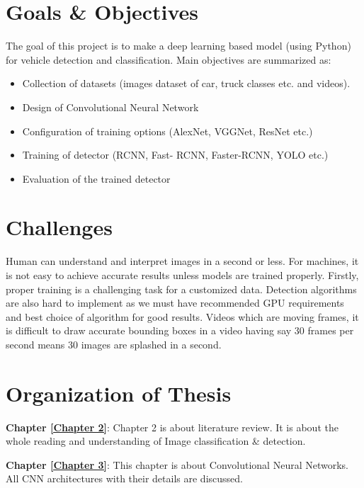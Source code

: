 \section{Goals \& Objectives}

The goal of this project is to make a deep learning based model (using Python) for vehicle detection and classification. Main objectives are summarized as:
\begin{itemize}
\item Collection of datasets (images dataset of car, truck classes etc. and videos).
\item Design of Convolutional Neural Network
\item Configuration of training options (AlexNet, VGGNet, ResNet etc.)
\item Training of detector (RCNN, Fast- RCNN, Faster-RCNN, YOLO etc.)
\item Evaluation of the trained detector
\end{itemize}

\section{Challenges}

Human can understand and interpret images in a 
second or less. For machines, it is not easy to achieve 
accurate results unless models are trained properly. Firstly, proper 
training is a challenging task for a customized data. Detection 
algorithms are also hard to implement as we must have recommended 
GPU requirements and best choice of algorithm for good results. Videos 
which are moving frames, it is difficult to draw accurate bounding boxes 
in a video having say 30 frames per second 
means 30 images are splashed in a second. 	


\section{Organization of Thesis}

\textbf{Chapter \ref{Chapter 2}}: Chapter 2 is about literature review. It is about
the whole reading and understanding of Image classification \& detection.

\noindent\textbf{Chapter \ref{Chapter 3}}: This chapter is about Convolutional Neural Networks. All CNN architectures with their details
are discussed.



